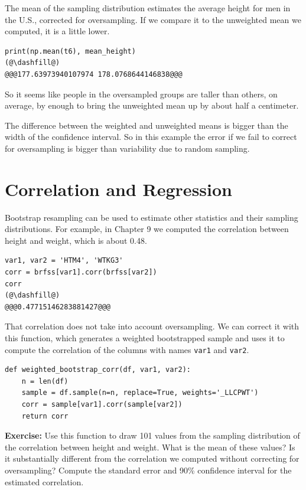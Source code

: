 The mean of the sampling distribution estimates the average height for
men in the U.S., corrected for oversampling. If we compare it to the
unweighted mean we computed, it is a little lower.

\begin{lstlisting}[]
print(np.mean(t6), mean_height)
(@\dashfill@)
@@@177.63973940107974 178.0768644146838@@@
\end{lstlisting}

So it seems like people in the oversampled groups are taller than
others, on average, by enough to bring the unweighted mean up by about
half a centimeter.

The difference between the weighted and unweighted means is bigger than
the width of the confidence interval. So in this example the error if we
fail to correct for oversampling is bigger than variability due to
random sampling.

\hypertarget{correlation-and-regression}{%
\section{Correlation and Regression}\label{correlation-and-regression}}

Bootstrap resampling can be used to estimate other statistics and their
sampling distributions. For example, in Chapter 9 we computed the
correlation between height and weight, which is about 0.48.

\begin{lstlisting}[]
var1, var2 = 'HTM4', 'WTKG3'
corr = brfss[var1].corr(brfss[var2])
corr
(@\dashfill@)
@@@0.47715146283881427@@@
\end{lstlisting}

That correlation does not take into account oversampling. We can correct
it with this function, which generates a weighted bootstrapped sample
and uses it to compute the correlation of the columns with names
\passthrough{\lstinline!var1!} and \passthrough{\lstinline!var2!}.

\begin{lstlisting}[]
def weighted_bootstrap_corr(df, var1, var2):
    n = len(df)
    sample = df.sample(n=n, replace=True, weights='_LLCPWT')
    corr = sample[var1].corr(sample[var2])
    return corr
\end{lstlisting}

\textbf{Exercise:} Use this function to draw 101 values from the
sampling distribution of the correlation between height and weight. What
is the mean of these values? Is it substantially different from the
correlation we computed without correcting for oversampling? Compute the
standard error and 90\% confidence interval for the estimated
correlation.

